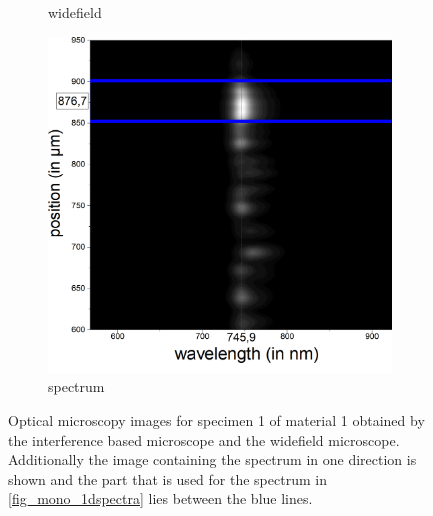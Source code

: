 \begin{figure}[H]
\begin{subfigure}{0.24\textwidth}
        \caption{widefield}
	      \label{fig_mono_spec1_wide}
    \end{subfigure}
    \begin{subfigure}{0.7\textwidth}
        \centering
        \includegraphics[width=\textwidth]{img/output_t1/bild_m1-3.png}
        \caption{spectrum}
	      \label{fig_mono_spec1_spec}
    \end{subfigure}
    \caption{Optical microscopy images for specimen 1 of material 1 obtained by the interference based microscope and the widefield microscope. Additionally the image containing the spectrum in one direction is shown and the part that is used for the spectrum in \cref{fig_mono_1dspectra} lies between the blue lines.}
	\label{fig_mono_spec1} %
\end{figure}

